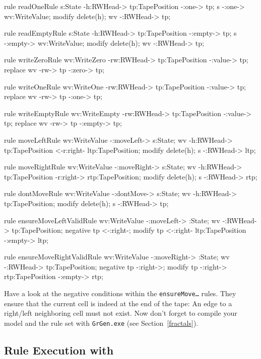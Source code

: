 \begin{grgen}[firstnumber=last] 
rule readOneRule {
	s:State -h:RWHead-> tp:TapePosition -:one-> tp;
	s -:one-> wv:WriteValue;
	modify {
		delete(h);
		wv -:RWHead-> tp;
	}
}

rule readEmptyRule {
	s:State -h:RWHead-> tp:TapePosition -:empty-> tp;
	s -:empty-> wv:WriteValue;
	modify {
		delete(h);
		wv -:RWHead-> tp;
	}
}

rule writeZeroRule {
	wv:WriteZero -rw:RWHead-> tp:TapePosition -:value-> tp;
	replace {
		wv -rw-> tp -:zero-> tp;
	}	
}

rule writeOneRule {
	wv:WriteOne -rw:RWHead-> tp:TapePosition -:value-> tp;
	replace {
		wv -rw-> tp -:one-> tp;
	}	
}

rule writeEmptyRule {
	wv:WriteEmpty -rw:RWHead-> tp:TapePosition -:value-> tp;
	replace {
		wv -rw-> tp -:empty-> tp;
	}	
}

rule moveLeftRule {
	wv:WriteValue -:moveLeft-> s:State;
	wv -h:RWHead-> tp:TapePosition <-r:right- ltp:TapePosition;
	modify {
		delete(h);
		s -:RWHead-> ltp;
	}
}

rule moveRightRule {
	wv:WriteValue -:moveRight-> s:State;
	wv -h:RWHead-> tp:TapePosition -r:right-> rtp:TapePosition;
	modify {
		delete(h);
		s -:RWHead-> rtp;
	}
}

rule dontMoveRule {
	wv:WriteValue -:dontMove-> s:State;
	wv -h:RWHead-> tp:TapePosition;
	modify {
		delete(h);
		s -:RWHead-> tp;
	}
}

rule ensureMoveLeftValidRule {
	wv:WriteValue -:moveLeft-> :State;
	wv -:RWHead-> tp:TapePosition;
	negative {
		tp <-:right-;
	}
	modify {
		tp <-:right- ltp:TapePosition -:empty-> ltp;
	}
}

rule ensureMoveRightValidRule {
	wv:WriteValue -:moveRight-> :State;
	wv -:RWHead-> tp:TapePosition;
	negative {
		tp -:right->;
	}
	modify {
		tp -:right-> rtp:TapePosition -:empty-> rtp;
	}
}
\end{grgen}
Have a look at the negative conditions within the \texttt{ensureMove\dots} rules. They ensure that the current cell is indeed at the end of the tape: An edge to a right/left neighboring cell must not exist. Now don't forget to compile your model and the rule set with \texttt{GrGen.exe} (see Section~\ref{fractals}).

\subsection{Rule Execution with \GrShell}

